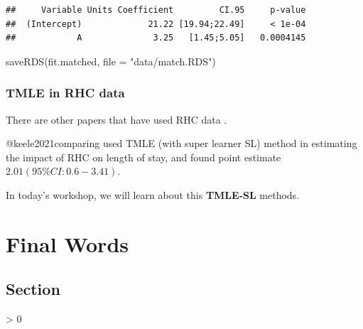 \documentclass[
]{book}
\newenvironment{Shaded}{\begin{snugshade}}{\end{snugshade}}
\newcommand{\AttributeTok}[1]{\textcolor[rgb]{0.77,0.63,0.00}{#1}}
\newcommand{\FunctionTok}[1]{\textcolor[rgb]{0.00,0.00,0.00}{#1}}
\newcommand{\NormalTok}[1]{#1}
\newcommand{\StringTok}[1]{\textcolor[rgb]{0.31,0.60,0.02}{#1}}
\newlength{\cslhangindent}
\newenvironment{CSLReferences}[2] %
 {%
  \setlength{\parindent}{0pt}
  \ifodd #1 \everypar{\setlength{\hangindent}{\cslhangindent}}\ignorespaces\fi
  \ifnum #2 > 0
  \setlength{\parskip}{#2\baselineskip}
  \fi
 }%
 {}
\begin{document}
\begin{verbatim}
##     Variable Units Coefficient         CI.95     p-value 
##  (Intercept)             21.22 [19.94;22.49]     < 1e-04 
##            A              3.25   [1.45;5.05]   0.0004145
\end{verbatim}

\begin{Shaded}
\begin{Highlighting}[]
\FunctionTok{saveRDS}\NormalTok{(fit.matched, }\AttributeTok{file =} \StringTok{"data/match.RDS"}\NormalTok{)   }
\end{Highlighting}
\end{Shaded}

\hypertarget{tmle-in-rhc-data}{%
\subsection{TMLE in RHC data}\label{tmle-in-rhc-data}}

There are other papers that have used RHC data \citep{keele2021comparing, keele2018pre}.

\begin{rmdcomment}
@keele2021comparing used TMLE (with super learner SL) method in
estimating the impact of RHC on length of stay, and found point estimate
\(2.01 (95\% CI: 0.6-3.41)\).
\end{rmdcomment}

In today's workshop, we will learn about this \textbf{TMLE-SL} methods.

\hypertarget{final-words}{%
\chapter{Final Words}\label{final-words}}

\hypertarget{section}{%
\section{Section}\label{section}}

\hypertarget{refs}{}
\begin{CSLReferences}{0}{0}
\end{CSLReferences}

  
\end{document}
